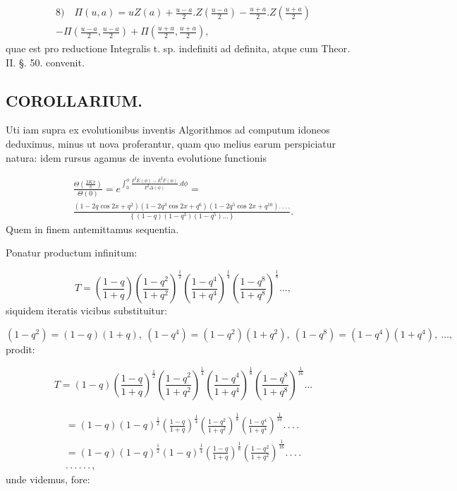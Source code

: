 \documentclass{article}
\begin{document}
\[
\begin{gathered}
\text{8)}\quad \Pi(u,a)=uZ(a)+\frac{u-a}{2}.Z\left(\frac{u-a}{2}\right)-\frac{u+a}{2}.Z\left(\frac{u+a}{2}\right)\\[1.5ex]
-\Pi\left(\frac{u-a}{2},\frac{u-a}{2}\right)+\Pi\left(\frac{u+a}{2},\frac{u+a}{2}\right),
\end{gathered}
\]
quae est pro reductione Integralis t. sp. indefiniti ad definita, atque cum Theor. II. §. 50. convenit.

\subsection*{COROLLARIUM.}

Uti iam supra ex evolutionibus inventis Algorithmos ad computum idoneos deduximus, minus ut nova proferantur, quam quo melius earum perspiciatur natura: idem rursus agamus de inventa evolutione functionis

\[
\begin{gathered}
\frac{\Theta\left(\frac{2Kx}{\pi}\right)}{\Theta(0)}=e^{\int_{0}^{\phi}\frac{F^{\mathrm{I}}E(\phi)-E^{\mathrm{I}}F(\phi)}{F^{\mathrm{I}}\Delta(\phi)}.d\phi}=\\[1.5ex]
\frac{(1-2q\cos2x+q^{2})(1-2q^{3}\cos2x+q^{6})(1-2q^{5}\cos2x+q^{10}).\,.\,.\,.}{\left\{(1-q)(1-q^{3})(1-q^{5})\ldots\right\}}.
\end{gathered}
\]
Quem in finem antemittamus sequentia.

Ponatur productum infinitum:

\[
T=\left(\frac{1-q}{1+q}\right)\left(\frac{1-q^{2}}{1+q^{2}}\right)^{\frac{1}{2}}\left(\frac{1-q^{4}}{1+q^{4}}\right)^{\frac{1}{4}}\left(\frac{1-q^{8}}{1+q^{8}}\right)^{\frac{1}{8}}\ldots,
\]
siquidem iteratis vicibus substituitur:

\[
(1-q^{2})=(1-q)(1+q),\ (1-q^{4})=(1-q^{2})(1+q^{2}),\ (1-q^{8})=(1-q^{4})(1+q^{4}),\ \ldots,
\]
prodit:

\[
T=(1-q)\left(\frac{1-q}{1+q}\right)^{\frac{1}{2}}\left(\frac{1-q^{2}}{1+q^{2}}\right)^{\frac{1}{4}}\left(\frac{1-q^{4}}{1+q^{4}}\right)^{\frac{1}{8}}\left(\frac{1-q^{8}}{1+q^{8}}\right)^{\frac{1}{16}}\ldots
\]

\[
\begin{gathered}
=(1-q)(1-q)^{\frac{1}{2}}\left(\frac{1-q}{1+q}\right)^{\frac{1}{4}}\left(\frac{1-q^{2}}{1+q^{2}}\right)^{\frac{1}{8}}\left(\frac{1-q^{4}}{1+q^{4}}\right)^{\frac{1}{16}}.\,.\,.\,.\\[1.5ex]
=(1-q)(1-q)^{\frac{1}{2}}(1-q)^{\frac{1}{4}}\left(\frac{1-q}{1+q}\right)^{\frac{1}{8}}\left(\frac{1-q^{2}}{1+q^{2}}\right)^{\frac{1}{16}}.\,.\,.\,.\\[1.5ex]
.\,.\,.\,.\,.\,.\,,
\end{gathered}
\]
unde videmus, fore:
\end{document}
